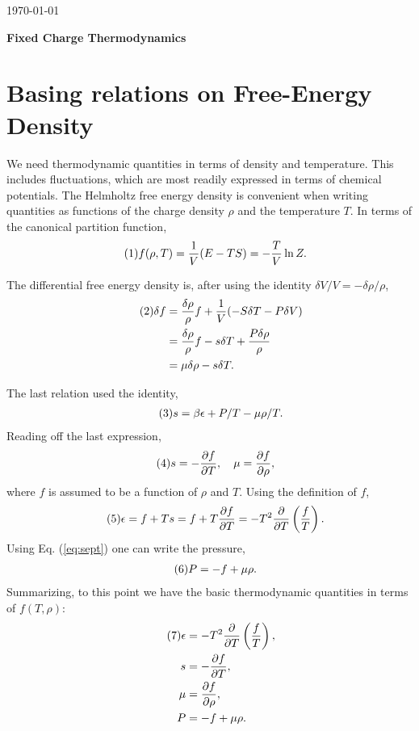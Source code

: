 \documentclass[12pt]{article}
\numberwithin{equation}{section}
\numberwithin{figure}{section}
\newcommand\eqnumber{\addtocounter{equation}{1}\tag{\theequation}}
\begin{document}
\today\\

\centerline{\bf \large Fixed Charge Thermodynamics}

\section{Basing relations on Free-Energy Density}

We need thermodynamic quantities in terms of density and temperature. This includes fluctuations, which are most readily expressed in terms of chemical potentials. The Helmholtz free energy density is convenient when writing quantities as functions of the charge density $\rho$ and the temperature $T$. In terms of the canonical partition function,
\begin{align*}\eqnumber
f(\rho,T)&=\frac{1}{V}(E-TS)=-\frac{T}{V}\ln Z.
\end{align*}

The differential free energy density is, after using the identity $\delta V/V=-\delta\rho/\rho$,
\begin{align*}\eqnumber
\delta f&=\frac{\delta\rho}{\rho}f+\frac{1}{V}(-S\delta T-P\delta V)\\
&=\frac{\delta\rho}{\rho}f-s\delta T+\frac{P\delta\rho}{\rho}\\
&=\mu \delta\rho-s\delta T.
\end{align*}

The last relation used the identity,
\begin{align*}\eqnumber\label{eq:sept}
s=\beta\epsilon+P/T-\mu\rho/T.
\end{align*}
Reading off the last expression,
\begin{align*}\eqnumber
s&=-\frac{\partial f}{\partial T},~~~\mu=\frac{\partial f}{\partial\rho},
\end{align*}
where $f$ is assumed to be a function of $\rho$ and $T$. Using the definition of $f$,
\begin{align*}\eqnumber
\epsilon&=f+Ts=f+T\frac{\partial f}{\partial T}=-T^2\frac{\partial}{\partial T}\left(\frac{f}{T}\right).
\end{align*}
Using Eq. (\ref{eq:sept}) one can write the pressure,
\begin{align*}\eqnumber
P&=-f+\mu\rho.
\end{align*}
Summarizing, to this point we have the basic thermodynamic quantities in terms of $f(T,\rho)$:
\begin{align*}\eqnumber
\epsilon&=-T^2\frac{\partial}{\partial T}\left(\frac{f}{T}\right),\\
s&=-\frac{\partial f}{\partial T},\\
\mu&=\frac{\partial f}{\partial \rho},\\
P&=-f+\mu\rho.
\end{align*}
\end{document}
